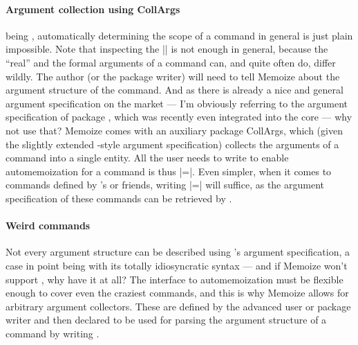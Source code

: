 \documentclass[a4paper,11pt]{article}
\begin{document}
\paragraph{Argument collection using CollArgs}
 being , automatically determining the scope of a
command in general is just plain impossible.  Note that inspecting the
|\meaning| is not enough in general, because the ``real'' and the formal
arguments of a command can, and quite often do, differ wildly.  The author (or the
package writer) will need to tell Memoize about the argument structure of the
command.  And as there is already a nice and general argument specification on
the market --- I'm obviously referring to the argument specification of package
, which was recently even integrated into the core 
--- why not use that?  Memoize comes with an auxiliary package CollArgs, which
(given the slightly extended -style argument specification)
collects the arguments of a command into a single entity.  All the user needs
to write to enable automemoization for a command is thus
|=|.  Even simpler,
when it comes to commands defined by 's 
or friends, writing |=|
will suffice, as the argument specification of these commands can be retrieved
by .

\paragraph{Weird commands}
Not every argument structure can be described using 's argument
specification, a case in point being  with its totally
idiosyncratic syntax --- and if Memoize won't support , why have it at
all?  The interface to automemoization must be flexible enough to cover even
the craziest commands, and this is why Memoize allows for arbitrary argument
collectors.  These are defined by the advanced user or package writer and then
declared to be used for parsing the argument structure of a command by writing
.
\end{document}
